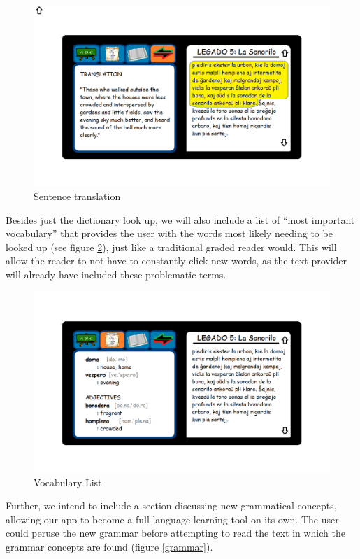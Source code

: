 \documentclass[11pt]{article}
\begin{document}
\begin{figure}[h]
  \caption{Sentence translation}
  \label{sentences}
  \includegraphics[scale=.5]{translate_tab.png}
\end{figure}

Besides just the dictionary look up, we will also include a list of ``most important vocabulary'' that provides the user with the words most likely needing to be looked up (see figure \ref{vocab}), just like a traditional graded reader would. This will allow the reader to not have to constantly click new words, as the text provider will already have included these problematic terms.

\begin{figure}[h]
  \caption{Vocabulary List}
  \label{vocab}
  \includegraphics[scale=.5]{vocabulary_list.png}
\end{figure}

Further, we intend to include a section discussing new grammatical concepts, allowing our app to become a full language learning tool on its own. The user could peruse the new grammar before attempting to read the text in which the grammar concepts are found (figure \ref{grammar}).
\end{document}

